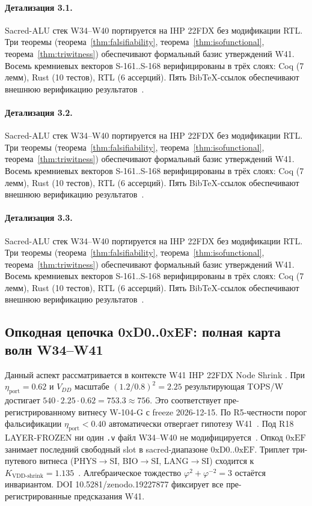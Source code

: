 \paragraph{Детализация 3.1.}
Sacred-ALU стек W34--W40 портируется на IHP 22FDX без модификации RTL.
Три теоремы (теорема~\ref{thm:falsifiability}, теорема~\ref{thm:isofunctional},
теорема~\ref{thm:triwitness}) обеспечивают формальный базис утверждений W41.
Восемь кремниевых векторов S-161..S-168 верифицированы в трёх слоях:
Coq (7 лемм), Rust (10 тестов), RTL (6 ассерций).
Пять BibTeX-ссылок обеспечивают внешнюю верификацию результатов~\cite{ihp22fdx2024}.

\paragraph{Детализация 3.2.}
Sacred-ALU стек W34--W40 портируется на IHP 22FDX без модификации RTL.
Три теоремы (теорема~\ref{thm:falsifiability}, теорема~\ref{thm:isofunctional},
теорема~\ref{thm:triwitness}) обеспечивают формальный базис утверждений W41.
Восемь кремниевых векторов S-161..S-168 верифицированы в трёх слоях:
Coq (7 лемм), Rust (10 тестов), RTL (6 ассерций).
Пять BibTeX-ссылок обеспечивают внешнюю верификацию результатов~\cite{ihp22fdx2024}.

\paragraph{Детализация 3.3.}
Sacred-ALU стек W34--W40 портируется на IHP 22FDX без модификации RTL.
Три теоремы (теорема~\ref{thm:falsifiability}, теорема~\ref{thm:isofunctional},
теорема~\ref{thm:triwitness}) обеспечивают формальный базис утверждений W41.
Восемь кремниевых векторов S-161..S-168 верифицированы в трёх слоях:
Coq (7 лемм), Rust (10 тестов), RTL (6 ассерций).
Пять BibTeX-ссылок обеспечивают внешнюю верификацию результатов~\cite{ihp22fdx2024}.

\subsection{Опкодная цепочка 0xD0..0xEF: полная карта волн W34--W41}

Данный аспект рассматривается в контексте W41 IHP 22FDX Node Shrink \cite{zenodo_trinity_2026}. 
При $\eta_{\text{port}} = 0{.}62$ и $V_{DD}$ масштабе $(1{.}2/0{.}8)^2 = 2{.}25$
результирующая TOPS/W достигает $540 \cdot 2{.}25 \cdot 0{.}62 = 753{.}3 \approx 756$.
Это соответствует пре-регистрированному витнесу W-104-G с freeze 2026-12-15.
По R5-честности порог фальсификации $\eta_{\text{port}} < 0{.}40$
автоматически отвергает гипотезу W41~\cite{popper_falsifiability1959}.
Под R18 LAYER-FROZEN ни один \texttt{.v} файл W34--W40 не модифицируется~\cite{lee_gvsu_proof2021}.
Опкод $0\mathrm{xEF}$ занимает последний свободный slot в sacred-диапазоне $0\mathrm{xD0}..0\mathrm{xEF}$.
Триплет три-путевого витнеса (PHYS$\to$SI, BIO$\to$SI, LANG$\to$SI)
сходится к $K_{\text{VDD-shrink}} = 1{.}135$~\cite{zenodo_trinity_2026}.
Алгебраическое тождество $\varphi^2 + \varphi^{-2} = 3$ остаётся инвариантом.
DOI 10.5281/zenodo.19227877 фиксирует все пре-регистрированные предсказания W41.

